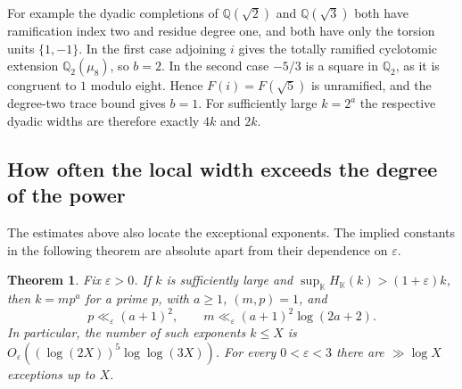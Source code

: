 \documentclass[11pt,letterpaper]{article}
\newtheorem{theorem}{Theorem}[section]
\theoremstyle{definition}
\numberwithin{equation}{section}
\begin{document}
For example the dyadic completions of $\mathbb Q(\sqrt2)$ and
$\mathbb Q(\sqrt3)$ both have ramification index two and residue
degree one, and both have only the torsion units $\{1,-1\}$.
In the first case adjoining $i$ gives the totally ramified
cyclotomic extension $\mathbb Q_2(\mu_8)$, so $b=2$.
In the second case $-5/3$ is a square in $\mathbb Q_2$, as it
is congruent to $1$ modulo eight. Hence $F(i)=F(\sqrt5)$ is
unramified, and the degree-two trace bound gives $b=1$.
For sufficiently large $k=2^a$ the respective dyadic widths are
therefore exactly $4k$ and $2k$.

\subsection{How often the local width exceeds the degree of the power}
\label{sec:local-sparse}

The estimates above also locate the exceptional exponents. The implied
constants in the following theorem are absolute apart from their dependence
on $\varepsilon$.
\begin{theorem}\label{thm:local-sparse}
Fix $\varepsilon>0$. If $k$ is sufficiently large and
$\sup_{\mathbb K}H_{\mathbb K}(k)>(1+\varepsilon)k$, then
$k=mp^a$ for a prime $p$, with $a\ge1$, $(m,p)=1$, and
\[
       p\ll_\varepsilon(a+1)^2,\qquad
       m\ll_\varepsilon (a+1)^2\log(2a+2).
\]
In particular, the number of such exponents $k\le X$ is
$O_\varepsilon((\log(2X))^5\log\log(3X))$.
For every $0<\varepsilon<3$ there are $\gg\log X$ exceptions up to $X$.
\end{theorem}
\end{document}
